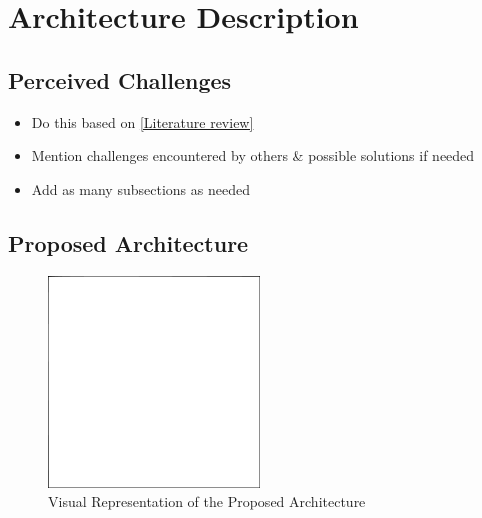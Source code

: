 \chapter{Architecture Description} \label{Arch description}

\section{Perceived Challenges} \label{challenges}

\begin{itemize}
	\item{Do this based on \ref{Literature review}}
	\item{Mention challenges encountered by others & possible solutions if needed}
	\item{Add as many subsections as needed}
\end{itemize}

\section{Proposed Architecture} \label{arch}

\begin{figure}
\centering \includegraphics[width=0.5\textwidth]{kuvat/placeholder.png}
\caption{Visual Representation of the Proposed Architecture}
\label{Arch fig} 
\end{figure}

